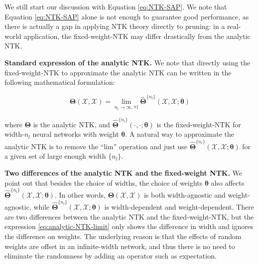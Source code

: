 \documentclass{article} %
\begin{document}
We still start our discussion with Equation \ref{eq:NTK-SAP}. We note that Equation \ref{eq:NTK-SAP} alone is not enough to guarantee good performance, as there is actually a gap in applying NTK theory directly to pruning: in a real-world application, the fixed-weight-NTK may differ drastically from the analytic NTK. 

\textbf{Standard expression of the analytic NTK.}
We note that directly using the fixed-weight-NTK to approximate the analytic NTK can be written in the following mathematical formulation:

\begin{equation}
\label{eq:analytic-NTK-limit}
    \boldsymbol{\Theta}(\mathcal{X},\mathcal{X})
   = \underset{ n_l\rightarrow\infty, \forall l}{\lim}
   \hat{\boldsymbol{\Theta}}^{\{n_l\}}(\mathcal{X},\mathcal{X}; \boldsymbol{\theta})
\end{equation}

where $\boldsymbol{\Theta}$ is the analytic NTK, and $\hat{\boldsymbol{\Theta}}^{\{n_l\}}(\cdot,\cdot;\boldsymbol{\theta})$ is the fixed-weight-NTK for width-$n_l$ neural networks with weight $\boldsymbol{\theta}$. 
A natural way to approximate the analytic NTK is to 
remove the ``lim'' operation and just use  $\hat{\boldsymbol{\Theta}}^{\{n_l\}}(\mathcal{X},\mathcal{X}; \boldsymbol{\theta}) $
for  a given set of large enough width $\{ n_l \} $.


\textbf{Two differences of the analytic NTK and the fixed-weight NTK.}
We point out that besides the choice of widths, the choice of weights $\boldsymbol{\theta}$ also affects  $\hat{\boldsymbol{\Theta}}^{\{n_l\}}(\mathcal{X},\mathcal{X}; \boldsymbol{\theta}) $. 
In  other words, $\boldsymbol{\Theta}(\mathcal{X},\mathcal{X}) $
 is  both width-agnostic and weight-agnostic,
 while $\hat{\boldsymbol{\Theta}}^{\{n_l\}}(\mathcal{X},\mathcal{X}; \boldsymbol{\theta}) $
 is width-dependent and weight-dependent.
 There are two differences between the analytic NTK
 and the fixed-weight-NTK, but the expression \ref{eq:analytic-NTK-limit} only shows
 the difference in width and ignores the difference
 on weights. 
 The underlying reason is that the effects of random weights are offset in an infinite-width network,
 and thus there is no need to eliminate the randomness
 by adding an operator such as expectation. 
 
\end{document}
